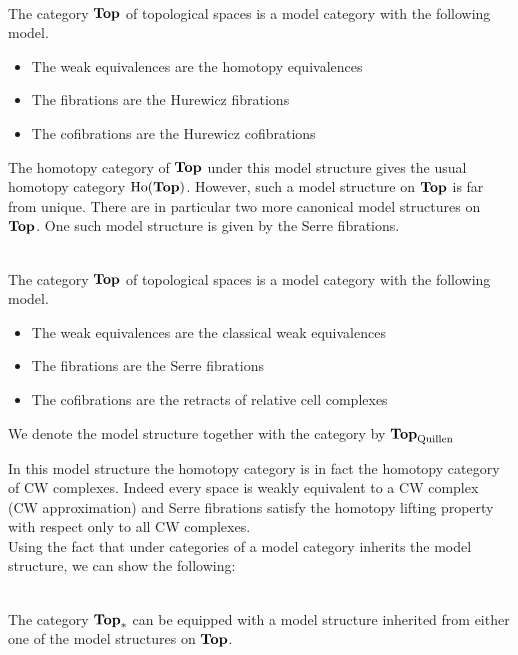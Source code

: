 \documentclass[a4paper]{article}
\begin{document}
\begin{thm}{}{}\\ The category $\bold{Top}$ of topological spaces is a model category with the following model. 
\begin{itemize}
\item The weak equivalences are the homotopy equivalences
\item The fibrations are the Hurewicz fibrations
\item The cofibrations are the Hurewicz cofibrations
\end{itemize}
\end{thm}

The homotopy category of $\bold{Top}$ under this model structure gives the usual homotopy category $\text{Ho}(\bold{Top})$. However, such a model structure on $\bold{Top}$ is far from unique. There are in particular two more canonical model structures on $\bold{Top}$. One such model structure is given by the Serre fibrations. 

\begin{thm}{}{}\\ The category $\bold{Top}$ of topological spaces is a model category with the following model. 
\begin{itemize}
\item The weak equivalences are the classical weak equivalences
\item The fibrations are the Serre fibrations
\item The cofibrations are the retracts of relative cell complexes
\end{itemize}
We denote the model structure together with the category by $\bold{Top}_\text{Quillen}$
\end{thm}

In this model structure the homotopy category is in fact the homotopy category of CW complexes. Indeed every space is weakly equivalent to a CW complex (CW approximation) and Serre fibrations satisfy the homotopy lifting property with respect only to all CW complexes. \\

Using the fact that under categories of a model category inherits the model structure, we can show the following: 

\begin{lmm}{}{}\\ The category $\bold{Top}_\ast$ can be equipped with a model structure inherited from either one of the model structures on $\bold{Top}$. 
\end{lmm}
\end{document}
